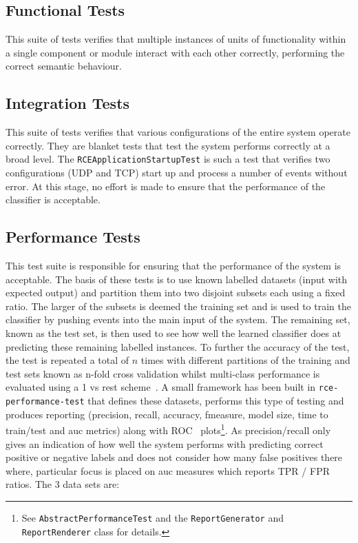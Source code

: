 \documentclass[a4paper,11pt]{scrreprt}
\begin{document}
\subsection{Functional Tests}
This suite of tests verifies that multiple instances of units of functionality within a single component or module interact with each other correctly, performing the correct semantic behaviour.
\subsection{Integration Tests}
This suite of tests verifies that various configurations of the entire system operate correctly. They are blanket tests that test the system performs correctly at a broad level. The \verb|RCEApplicationStartupTest| is such a test that verifies two configurations (UDP and TCP) start up and process a number of events without error. At this stage, no effort is made to ensure that the performance of the classifier is acceptable.
\subsection{Performance Tests}
This test suite is responsible for ensuring that the performance of the system is acceptable. The basis of these tests is to use known labelled datasets (input with expected output) and partition them into two disjoint subsets each using a fixed ratio. The larger of the subsets is deemed the training set and is used to train the classifier by pushing events into the main input of the system. The remaining set, known as the test set, is then used to see how well the learned classifier does at predicting these remaining labelled instances. To further the accuracy of the test, the test is repeated a total of \(n\) times with different partitions of the training and test sets known as n-fold cross validation whilst multi-class performance is evaluated using a 1 vs rest scheme~\cite{flach}. A small framework has been built in \verb|rce-performance-test| that defines these datasets, performs this type of testing and produces reporting (precision, recall, accuracy, fmeasure, model size, time to train/test and \acrshort{auc} metrics) along with ROC~\cite{roc-analysis} plots\footnote{See \verb|AbstractPerformanceTest| and the \verb|ReportGenerator| and \verb|ReportRenderer| class for details.}. As precision/recall only gives an indication of how well the system performs with predicting correct positive or negative labels and does not consider how many false positives there where, particular focus is placed on \acrshort{auc} measures which reports TPR / FPR ratios. The 3 data sets are:
\end{document}
